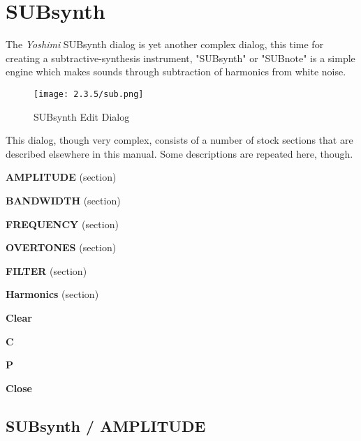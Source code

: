 %
%
%

\section{SUBsynth}
\label{sec:subsynth}

   The \textsl{Yoshimi} SUBsynth dialog is yet another complex dialog, this time
   for creating a subtractive-synthesis instrument,
   "SUBsynth" or "SUBnote" is a simple engine which makes sounds through
   subtraction of harmonics from white noise.  \cite{zyndoc}

\begin{figure}[H]
   \centering
   \texttt{[image: 2.3.5/sub.png]}
   \caption{SUBsynth Edit Dialog}
   \label{fig:subsynth_edit_dialog}
\end{figure}

   This dialog, though very complex, consists of a number of stock sections
   that are described elsewhere in this manual.
   Some descriptions are repeated here, though.

   \begin{enumber}
      \item \textbf{AMPLITUDE} (section)
      \item \textbf{BANDWIDTH} (section)
      \item \textbf{FREQUENCY} (section)
      \item \textbf{OVERTONES} (section)
      \item \textbf{FILTER} (section)
      \item \textbf{Harmonics} (section)
      \item \textbf{Clear}
      \item \textbf{C}
      \item \textbf{P}
      \item \textbf{Close}
   \end{enumber}

\subsection{SUBsynth / AMPLITUDE}
\label{subsec:subsynth_amplitude}

